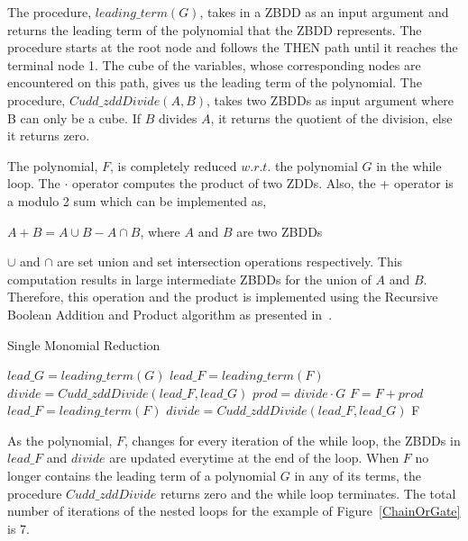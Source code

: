 \documentclass{article}
\theoremstyle{definition}
\begin{document}
\par The procedure, $ leading\_term(G)$, takes in a ZBDD as an input argument and returns the leading term of the polynomial that the ZBDD represents. The procedure starts at the root node and follows the THEN path until it reaches the terminal node 1. The cube of the variables, whose corresponding nodes are encountered on this path, gives us the leading term of the polynomial. The procedure, $Cudd\_zddDivide(A,B)$, takes two ZBDDs as input argument where B can only be a cube. If $B$ divides $A$, it returns the quotient of the division,  else it returns zero.
\par The polynomial, $F$, is completely reduced $w.r.t.$ the polynomial $G$ in the while loop. The $\cdot$ operator computes the product of two ZDDs. Also, the + operator is a modulo 2 sum which can be implemented as,
\begin{center}
$A + B = A \cup B - A \cap B$, where $A$ and $B$ are two ZBDDs
\end{center}
$\cup$ and $\cap$ are set union and set intersection operations respectively. This computation results in large intermediate ZBDDs for the union of $A$ and $B$. Therefore, this operation and the product is implemented using the Recursive Boolean Addition and Product algorithm as presented in~\cite{polybori}. 

\begin{algorithm}
\caption{Single Monomial Reduction}
\label{singlemon}
\begin{algorithmic}[1]
\State $lead\_G = leading\_term(G)$
\State $lead\_F = leading\_term(F)$
\State $divide = Cudd\_zddDivide(lead\_F,lead\_G)$
\State $prod = divide \cdot G$
\State $F = F + prod$
\State $lead\_F = leading\_term(F)$
\State $divide = Cudd\_zddDivide(lead\_F,lead\_G)$
\EndWhile
\EndFor
\State \Return F
\EndProcedure
\end{algorithmic}
\end{algorithm}
\par As the polynomial, $F$, changes for every iteration of the while loop, the ZBDDs in $lead\_F$ and $divide$ are updated everytime at the end of the loop. When $F$ no longer contains the leading term of a polynomial $G$ in any of its terms, the procedure $Cudd\_zddDivide$ returns zero and the while loop terminates. The total number of iterations of the nested loops for the example of Figure~\ref{ChainOrGate} is 7.
\end{document}
